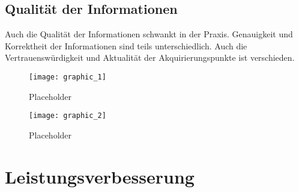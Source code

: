 \subsection{Qualität der Informationen}
Auch die Qualität der Informationen schwankt in der Praxis. Genauigkeit und Korrektheit der Informationen sind teils unterschiedlich. Auch die Vertrauenswürdigkeit und Aktualität der Akquirierungspunkte ist verschieden.


\begin{figure}[H]
\texttt{[image: graphic\_1]}
\caption{Placeholder}
\label{Placeholder}
\end{figure}
\begin{figure}[H]
\texttt{[image: graphic\_2]}
\caption{Placeholder}
\label{Placeholder}
\end{figure}

\section{Leistungsverbesserung}
